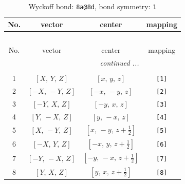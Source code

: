 \documentclass[fleqn,8pt]{jsarticle}
\begin{document}
\begin{longtable}{cccc}
\caption{Wyckoff bond: {\tt 8a@8d}, bond symmetry: {\tt 1}}
 \\
 \hline \hline
No. & vector & center & mapping \\ \hline \endfirsthead

\multicolumn{3}{l}{\tablename\ \thetable{}} \\
 \hline \hline
No. & vector & center & mapping \\ \hline \endhead

 \hline \hline
\multicolumn{3}{r}{\footnotesize\it continued ...} \\ \endfoot

 \hline \hline
\multicolumn{3}{r}{} \\ \endlastfoot

1 & $\left[ X,\, Y,\, Z \right]$ & $\left[ x,\, y,\, z \right]$ & {\tt [1]} \\ \hline
2 & $\left[ - X,\, - Y,\, Z \right]$ & $\left[ - x,\, - y,\, z \right]$ & {\tt [2]} \\ \hline
3 & $\left[ - Y,\, X,\, Z \right]$ & $\left[ - y,\, x,\, z \right]$ & {\tt [3]} \\ \hline
4 & $\left[ Y,\, - X,\, Z \right]$ & $\left[ y,\, - x,\, z \right]$ & {\tt [4]} \\ \hline
5 & $\left[ X,\, - Y,\, Z \right]$ & $\left[ x,\, - y,\, z + \frac{1}{2} \right]$ & {\tt [5]} \\ \hline
6 & $\left[ - X,\, Y,\, Z \right]$ & $\left[ - x,\, y,\, z + \frac{1}{2} \right]$ & {\tt [6]} \\ \hline
7 & $\left[ - Y,\, - X,\, Z \right]$ & $\left[ - y,\, - x,\, z + \frac{1}{2} \right]$ & {\tt [7]} \\ \hline
8 & $\left[ Y,\, X,\, Z \right]$ & $\left[ y,\, x,\, z + \frac{1}{2} \right]$ & {\tt [8]} \\
\end{longtable}
\end{document}
